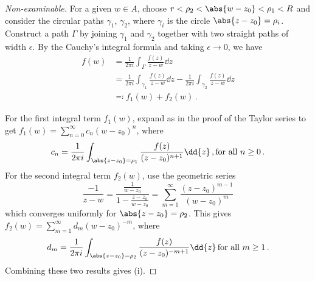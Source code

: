 \documentclass{article}
\theoremstyle{plain}\theoremheaderfont{\normalfont\itshape}\theorembodyfont{\rmfamily}\theoremseparator{.}\newtheorem*{rem}{Remark}\newtheorem*{ex}{Example}\newtheorem*{proof}{Proof}\newtheorem*{altp}{Alternative proof}
\theoremstyle{plain}\theoremheaderfont{\normalfont\bfseries}\theorembodyfont{\rmfamily}\theoremseparator{.}\newtheorem{thm}{Theorem}[section]\newtheorem{lem}[thm]{Lemma}\newtheorem{prop}[thm]{Proposition}\newtheorem*{cor}{Corollary}\newtheorem{defn}[thm]{Definition}\newtheorem{clm}[thm]{Claim}\newtheorem{clminproof}{Claim}
\theoremstyle{break}\theoremheaderfont{\normalfont\itshape}\theorembodyfont{\rmfamily}\theoremseparator{.\medskip}\newtheorem*{proofskip}{Proof}\newtheorem*{exs}{Examples}\newtheorem*{rems}{Remarks}
\theoremstyle{break}\theoremheaderfont{\normalfont\bfseries}\theorembodyfont{\rmfamily}\theoremseparator{.\medskip}\newtheorem{lemskip}[thm]{Lemma}\newtheorem{defnskip}[thm]{Definition}\newtheorem{propskip}[thm]{Proposition}\newtheorem{thmskip}[thm]{Theorem}
\numberwithin{equation}{section}
\begin{document}
	\begin{proof}[Non-examinable]
		For a given \(w\in A\), choose \(r<\rho_2<\abs{w-z_0}<\rho_1<R\) and consider the circular paths \(\gamma_1\), \(\gamma_2\), where \(\gamma_i\) is the circle \(\abs{z-z_0}=\rho_i\). Construct a path \(\Gamma\) by joining \(\gamma_1\) and \(\gamma_2\) together with two straight paths of width \(\epsilon\). By the Cauchy's integral formula and taking \(\epsilon\to 0\), we have
		\begin{align*}
			f(w)&=\frac{1}{2\pi i}\int_{\Gamma}\frac{f(z)}{z-w}\dd{z}\\
			&=\frac{1}{2\pi i}\int_{\gamma_1}\frac{f(z)}{z-w}\dd{z}-\frac{1}{2\pi i}\int_{\gamma_2}\frac{f(z)}{z-w}\dd{z}\\
			&\eqqcolon f_1(w)+f_2(w)\,.
		\end{align*}

		\begin{figure}
			\centering
		\end{figure}

		For the first integral term \(f_1(w)\), expand as in the proof of the Taylor series to get \(f_1(w)=\sum_{n=0}^{\infty}c_n(w-z_0)^n\), where
		\[c_n=\frac{1}{2\pi i}\int_{\abs{z-z_0}=\rho_1}\frac{f(z)}{(z-z_0)^{n+1}}\dd{z}\,,\text{for all }n\ge 0\,.\]
		For the second integral term \(f_2(w)\), use the geometric series
		\[\frac{-1}{z-w}=\frac{\frac{1}{w-z_0}}{1-\frac{z-z_0}{w-z_0}}=\sum_{m=1}^{\infty}\frac{(z-z_0)^{m-1}}{(w-z_0)^m}\]
		which converges uniformly for \(\abs{z-z_0}=\rho_2\). This gives \(f_2(w)=\sum_{m=1}^{\infty}d_m(w-z_0)^{-m}\), where
		\[d_m=\frac{1}{2\pi i}\int_{\abs{z-z_0}=\rho_2}\frac{f(z)}{(z-z_0)^{-m+1}}\dd{z}\,\text{for all }m\ge 1\,.\]
		Combining these two results gives (i).


\end{proof}
\end{document}
